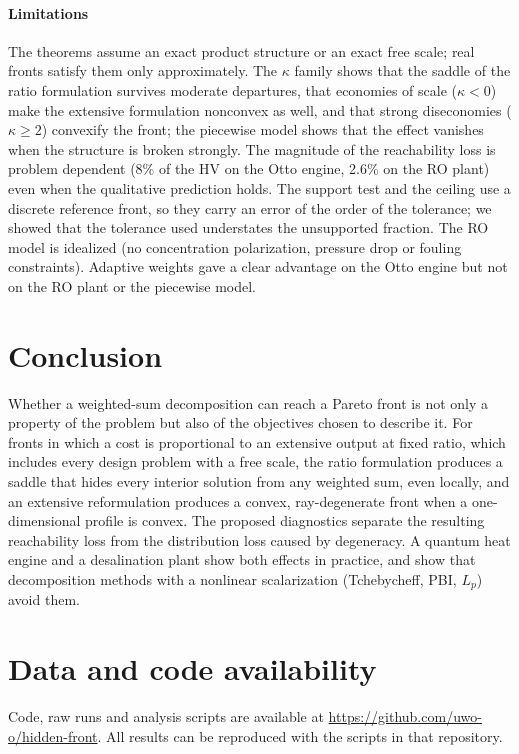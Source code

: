 \documentclass[journal]{IEEEtran}
\theoremstyle{remark}
\begin{document}
\paragraph*{Limitations} The theorems assume an exact product structure or an exact free scale; real
fronts satisfy them only approximately. The $\kappa$ family shows that the saddle of the ratio formulation
survives moderate departures, that economies of scale ($\kappa < 0$) make the extensive formulation
nonconvex as well, and that strong diseconomies ($\kappa \ge 2$) convexify the front; the piecewise model
shows that the effect vanishes when the structure is broken strongly. The magnitude of the reachability
loss is problem dependent (8\% of the HV on the Otto engine, 2.6\% on the RO plant) even when the
qualitative prediction holds. The support test and the ceiling use a discrete reference front, so they
carry an error of the order of the tolerance; we showed that the tolerance used understates the
unsupported fraction. The RO model is idealized (no concentration polarization, pressure drop or fouling
constraints). Adaptive weights gave a clear advantage on the Otto engine
but not on the RO plant or the piecewise model.

\section{Conclusion}

Whether a weighted-sum decomposition can reach a Pareto front is not only a property of the problem
but also of the objectives chosen to describe it. For fronts in which a cost is proportional to an
extensive output at fixed ratio, which includes every design problem with a free scale, the ratio
formulation produces a saddle that hides every interior solution from any weighted sum, even locally,
and an extensive reformulation produces a convex, ray-degenerate front when a one-dimensional profile is
convex. The proposed diagnostics separate the resulting reachability loss from the distribution loss
caused by degeneracy. A quantum heat engine and a desalination plant show both effects in practice, and
show that decomposition methods with a nonlinear scalarization (Tchebycheff, PBI, $L_p$) avoid them.

\section*{Data and code availability}
Code, raw runs and analysis scripts are available at \url{https://github.com/uwo-o/hidden-front}. All results can be reproduced with the scripts in that repository.
\end{document}
